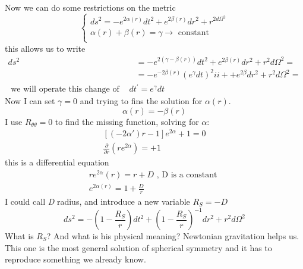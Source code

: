 Now we can do some restrictions on the metric
\begin{equation}
\begin{cases}
ds^{2} = -e ^{2\alpha \left( r \right)}dt^{2} + e^{2\beta \left( r \right)} dr^{2} + r^{2 d\Omega ^{2}} \\
 \alpha \left( r  \right) + \beta \left( r \right) = \gamma \to  \text{ constant }\\
\end{cases}
\end{equation}
this allows us to write
\begin{align}
	ds^{2} &= -e^{2\left( \gamma  - \beta \left( r \right) \right)} dt^{2} + e^{2\beta \left( r \right)} dr^{2} + r^{2} d\Omega^{2} = \\
	       & = -e ^{-2\beta \left( r \right)} \left( e^{\gamma }dt \right)^{2}i i ++ e^{2\beta }dr^{2} + r^{2} d\Omega ^{2} = \\
	       \text{ we will operate this change of variables } dt^{\prime } = e^{\gamma }dt 
\end{align}
Now I can set $\gamma =0$ and trying to fins the solution for $\alpha \left( r \right)$.
\[
\alpha \left( r \right) = - \beta \left( r \right)
\]
I use $R_{\theta \theta } = 0$ to find the missing function, solving for $\alpha $:
\begin{gather*}
	\left[ \left( -2\alpha \prime  \right)r-1\right]e^{2\alpha }+1 = 0 \\
	\frac{\partial }{\partial r} \left( re^{2\alpha } \right) = +1
\end{gather*}
this is a differential equation 
\begin{gather*}
re^{2\alpha }\left( r \right) = r + D \text{ , D is a constant } \\
e^{2\alpha \left( r \right)} = 1 + \frac{D}{r}
\end{gather*}
I could call \emph{D} radius, and introduce a new variable $R_{S} = - D$
\begin{equation}
ds^{2} = - \left( 1- \frac{R_{S}}{r} \right)dt^{2} + \left( 1 - \frac{R_{S}}{r} \right)^{-1} dr^{2} + r^{2}d\Omega ^{2}
\end{equation}
What is $R_{S}$? And what is his physical meaning? Newtonian gravitation helps us. This one is the most  general solution of spherical symmetry and it has to reproduce something we already know.\par

